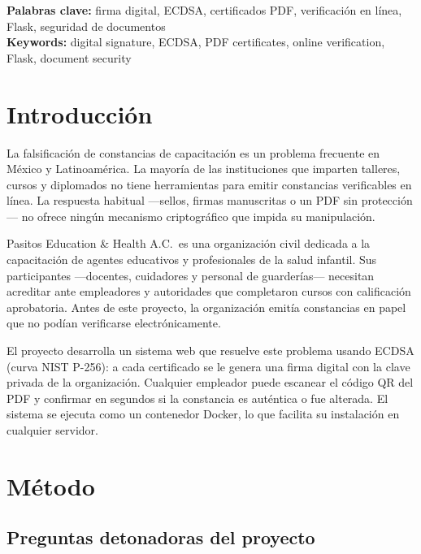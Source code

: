 \documentclass[11pt,letterpaper]{article}
\begin{document}
\vspace{0.8cm}
\noindent\textbf{Palabras clave:} firma digital, ECDSA, certificados PDF, verificaci\'on en l\'inea,
Flask, seguridad de documentos\\[4pt]
\textbf{Keywords:} digital signature, ECDSA, PDF certificates, online verification, Flask,
document security

\newpage
\tableofcontents
\newpage

\section{Introducci\'on}

La falsificaci\'on de constancias de capacitaci\'on es un problema frecuente en
M\'exico y Latinoam\'erica. La mayor\'ia de las instituciones que imparten talleres,
cursos y diplomados no tiene herramientas para emitir constancias verificables en
l\'inea. La respuesta habitual ---sellos, firmas manuscritas o un PDF sin
protecci\'on--- no ofrece ning\'un mecanismo criptogr\'afico que impida su
manipulaci\'on.

Pasitos Education \& Health A.C.\ es una organizaci\'on civil dedicada a la
capacitaci\'on de agentes educativos y profesionales de la salud infantil. Sus
participantes ---docentes, cuidadores y personal de guarder\'ias--- necesitan acreditar
ante empleadores y autoridades que completaron cursos con calificaci\'on aprobatoria.
Antes de este proyecto, la organizaci\'on emit\'ia constancias en papel que no
pod\'ian verificarse electr\'onicamente.

El proyecto desarrolla un sistema web que resuelve este problema usando ECDSA
(curva NIST P-256): a cada certificado se le genera una firma digital con la clave
privada de la organizaci\'on. Cualquier empleador puede escanear el c\'odigo QR del
PDF y confirmar en segundos si la constancia es aut\'entica o fue alterada. El sistema
se ejecuta como un contenedor Docker, lo que facilita su instalaci\'on en cualquier
servidor.

\section{M\'etodo}

\subsection{Preguntas detonadoras del proyecto}
\end{document}

